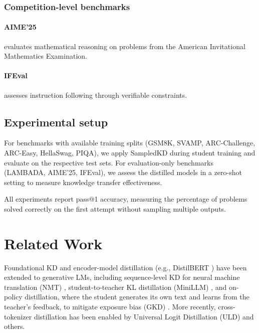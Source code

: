 \documentclass[11pt]{article}
\begin{document}
\subsubsection{Competition-level benchmarks}
\paragraph{AIME'25} evaluates mathematical reasoning on problems from the American Invitational Mathematics Examination.
\paragraph{IFEval} \citep{zhou2023ifeval} assesses instruction following through verifiable constraints.

\subsection{Experimental setup}

For benchmarks with available training splits (GSM8K, SVAMP, ARC-Challenge, ARC-Easy, HellaSwag, PIQA), we apply SampledKD during student training and evaluate on the respective test sets. For evaluation-only benchmarks (LAMBADA, AIME'25, IFEval), we assess the distilled models in a zero-shot setting to measure knowledge transfer effectiveness.

All experiments report pass@1 accuracy, measuring the percentage of problems solved correctly on the first attempt without sampling multiple outputs.

\section{Related Work}

Foundational KD \citep{hinton2015distillation} and encoder-model distillation (e.g., DistilBERT \citep{sanh2019distilbert}) have been extended to generative LMs, including sequence-level KD for neural machine translation (NMT) \citep{kim2016sequencekd}, student-to-teacher KL distillation (MiniLLM) \citep{gu2023minillm}, and on-policy distillation, where the student generates its own text and learns from the teacher's feedback, to mitigate exposure bias (GKD) \citep{agarwal2024gkd}.
More recently, cross-tokenizer distillation has been enabled by Universal Logit Distillation (ULD) \citep{boizard2024uld} and others.
\end{document}
